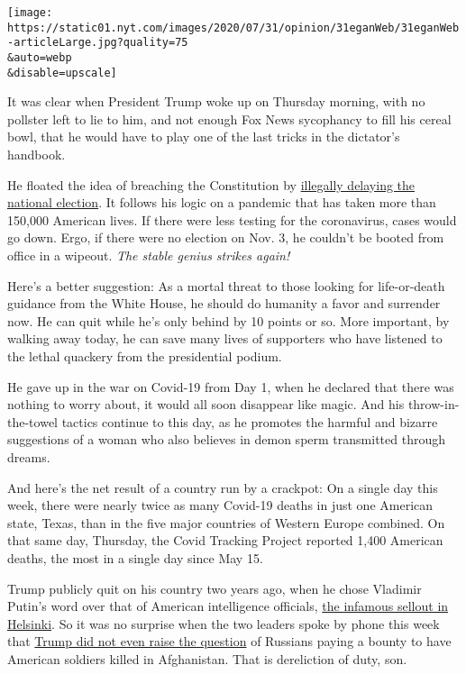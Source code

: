 \texttt{[image: https://static01.nyt.com/images/2020/07/31/opinion/31eganWeb/31eganWeb-articleLarge.jpg?quality=75\\\&auto=webp\\\&disable=upscale]}

It was clear when President Trump woke up on Thursday morning, with no
pollster left to lie to him, and not enough Fox News sycophancy to fill
his cereal bowl, that he would have to play one of the last tricks in
the dictator's handbook.

He floated the idea of breaching the Constitution by
\href{https://www.nytimes.com/2020/07/30/us/elections/biden-vs-trump.html}{illegally
delaying the national election}. It follows his logic on a pandemic that
has taken more than 150,000 American lives. If there were less testing
for the coronavirus, cases would go down. Ergo, if there were no
election on Nov. 3, he couldn't be booted from office in a wipeout.
\emph{The stable genius strikes again!}

Here's a better suggestion: As a mortal threat to those looking for
life-or-death guidance from the White House, he should do humanity a
favor and surrender now. He can quit while he's only behind by 10 points
or so. More important, by walking away today, he can save many lives of
supporters who have listened to the lethal quackery from the
presidential podium.

He gave up in the war on Covid-19 from Day 1, when he declared that
there was nothing to worry about, it would all soon disappear like
magic. And his throw-in-the-towel tactics continue to this day, as he
promotes the harmful and bizarre suggestions of a woman who also
believes in demon sperm transmitted through dreams.

And here's the net result of a country run by a crackpot: On a single
day this week, there were nearly twice as many Covid-19 deaths in just
one American state, Texas, than in the five major countries of Western
Europe combined. On that same day, Thursday, the Covid Tracking Project
reported 1,400 American deaths, the most in a single day since May 15.

Trump publicly quit on his country two years ago, when he chose Vladimir
Putin's word over that of American intelligence officials,
\href{https://www.nytimes.com/2018/07/16/opinion/putin-trump-meeting-helsinki.html}{the
infamous sellout in Helsinki}. So it was no surprise when the two
leaders spoke by phone this week that
\href{https://www.nytimes.com/2020/07/29/us/politics/trump-putin-bounties.html}{Trump
did not even raise the question} of Russians paying a bounty to have
American soldiers killed in Afghanistan. That is dereliction of duty,
son.

